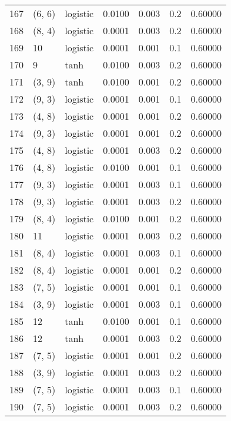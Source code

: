 \begin{tabular}{lllrrrr}
167 &      (6, 6) &  logistic &  0.0100 &  0.003 &  0.2 &   0.60000 \\
168 &      (8, 4) &  logistic &  0.0001 &  0.003 &  0.2 &   0.60000 \\
169 &          10 &  logistic &  0.0001 &  0.001 &  0.1 &   0.60000 \\
170 &           9 &      tanh &  0.0100 &  0.003 &  0.2 &   0.60000 \\
171 &      (3, 9) &      tanh &  0.0100 &  0.001 &  0.2 &   0.60000 \\
172 &      (9, 3) &  logistic &  0.0001 &  0.001 &  0.1 &   0.60000 \\
173 &      (4, 8) &  logistic &  0.0001 &  0.001 &  0.2 &   0.60000 \\
174 &      (9, 3) &  logistic &  0.0001 &  0.001 &  0.2 &   0.60000 \\
175 &      (4, 8) &  logistic &  0.0001 &  0.003 &  0.2 &   0.60000 \\
176 &      (4, 8) &  logistic &  0.0100 &  0.001 &  0.1 &   0.60000 \\
177 &      (9, 3) &  logistic &  0.0001 &  0.003 &  0.1 &   0.60000 \\
178 &      (9, 3) &  logistic &  0.0001 &  0.003 &  0.2 &   0.60000 \\
179 &      (8, 4) &  logistic &  0.0100 &  0.001 &  0.2 &   0.60000 \\
180 &          11 &  logistic &  0.0001 &  0.003 &  0.2 &   0.60000 \\
181 &      (8, 4) &  logistic &  0.0001 &  0.003 &  0.1 &   0.60000 \\
182 &      (8, 4) &  logistic &  0.0001 &  0.001 &  0.2 &   0.60000 \\
183 &      (7, 5) &  logistic &  0.0001 &  0.001 &  0.1 &   0.60000 \\
184 &      (3, 9) &  logistic &  0.0001 &  0.003 &  0.1 &   0.60000 \\
185 &          12 &      tanh &  0.0100 &  0.001 &  0.1 &   0.60000 \\
186 &          12 &      tanh &  0.0001 &  0.003 &  0.2 &   0.60000 \\
187 &      (7, 5) &  logistic &  0.0001 &  0.001 &  0.2 &   0.60000 \\
188 &      (3, 9) &  logistic &  0.0001 &  0.003 &  0.2 &   0.60000 \\
189 &      (7, 5) &  logistic &  0.0001 &  0.003 &  0.1 &   0.60000 \\
190 &      (7, 5) &  logistic &  0.0001 &  0.003 &  0.2 &   0.60000 \\

\end{tabular}
